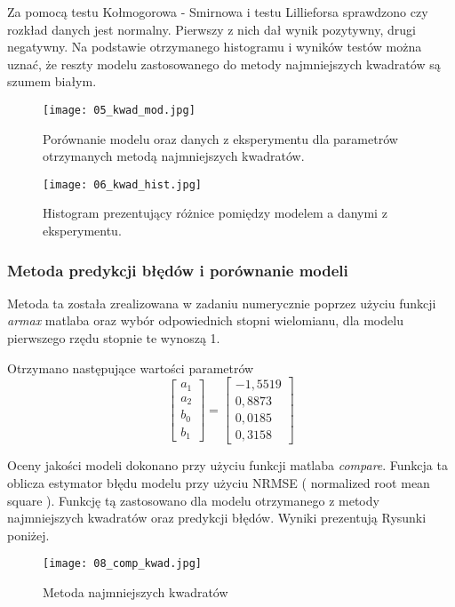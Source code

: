\documentclass[a4paper,15pt]{article}
\begin{document}
Za pomocą testu Kołmogorowa - Smirnowa i testu Lillieforsa sprawdzono czy rozkład danych jest normalny. Pierwszy z nich dał wynik pozytywny, drugi negatywny. Na podstawie otrzymanego histogramu i wyników testów można uznać, że reszty modelu zastosowanego do metody najmniejszych kwadratów są szumem białym. 

\begin{figure}[H]
\centerline{\texttt{[image: 05\_kwad\_mod.jpg]}}
\centering
\caption{Porównanie modelu oraz danych z eksperymentu dla parametrów otrzymanych metodą najmniejszych kwadratów.}
\label{fig:01_kwad_mod}
\end{figure}

\begin{figure}[H]
\centerline{\texttt{[image: 06\_kwad\_hist.jpg]}}
\centering
\caption{Histogram prezentujący różnice pomiędzy modelem a danymi z eksperymentu.}
\label{fig:01_kwad_hist}
\end{figure}

\subsubsection{Metoda predykcji błędów i porównanie modeli}
Metoda ta została zrealizowana w zadaniu numerycznie poprzez użyciu funkcji \textit{armax} matlaba oraz wybór odpowiednich stopni wielomianu, dla modelu pierwszego rzędu stopnie te wynoszą 1.

Otrzymano następujące wartości parametrów
\begin{equation}
\begin{bmatrix}
a_1 \\
a_2 \\
b_0 \\
b_1 
\end{bmatrix}
=
\begin{bmatrix}
-1,5519 \\
0,8873 \\
0,0185 \\
0,3158
\end{bmatrix}
\end{equation}

Oceny jakości modeli dokonano przy użyciu funkcji matlaba \textit{compare}. Funkcja ta oblicza estymator błędu modelu przy użyciu NRMSE ( normalized root mean square ). Funkcję tą zastosowano dla modelu otrzymanego z metody najmniejszych kwadratów oraz predykcji błędów. Wyniki prezentują Rysunki poniżej. 

\begin{figure}[H]
\centerline{\texttt{[image: 08\_comp\_kwad.jpg]}}
\centering
\caption{Metoda najmniejszych kwadratów}
\label{fig:01_kwad_hist}
\end{figure}
\end{document}
